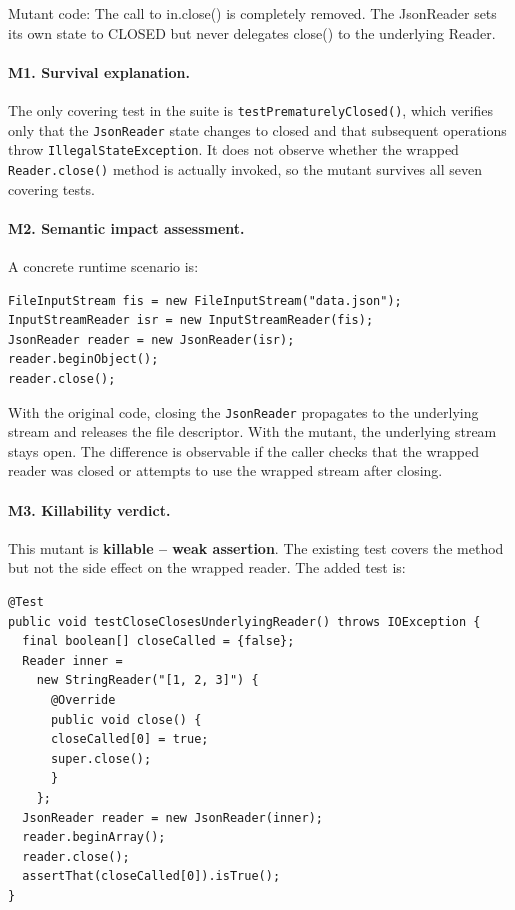 \documentclass[11pt]{article}
\begin{document}
Mutant code: The call to in.close() is completely removed. The JsonReader sets its own state to CLOSED but never delegates close() to the underlying Reader.

\paragraph{M1. Survival explanation.}
The only covering test in the suite is \texttt{testPrematurelyClosed()}, which verifies only that the \texttt{JsonReader} state changes to closed and that subsequent operations throw \texttt{IllegalStateException}. It does not observe whether the wrapped \texttt{Reader.close()} method is actually invoked, so the mutant survives all seven covering tests.

\paragraph{M2. Semantic impact assessment.}
A concrete runtime scenario is:
\begin{lstlisting}[basicstyle=\ttfamily\small,breaklines=true]
FileInputStream fis = new FileInputStream("data.json");
InputStreamReader isr = new InputStreamReader(fis);
JsonReader reader = new JsonReader(isr);
reader.beginObject();
reader.close();
\end{lstlisting}

With the original code, closing the \texttt{JsonReader} propagates to the underlying stream and releases the file descriptor. With the mutant, the underlying stream stays open. The difference is observable if the caller checks that the wrapped reader was closed or attempts to use the wrapped stream after closing.

\paragraph{M3. Killability verdict.}
This mutant is \textbf{killable -- weak assertion}. The existing test covers the method but not the side effect on the wrapped reader. The added test is:
\begin{lstlisting}[basicstyle=\ttfamily\small,breaklines=true]
@Test
public void testCloseClosesUnderlyingReader() throws IOException {
  final boolean[] closeCalled = {false};
  Reader inner =
    new StringReader("[1, 2, 3]") {
      @Override
      public void close() {
      closeCalled[0] = true;
      super.close();
      }
    };
  JsonReader reader = new JsonReader(inner);
  reader.beginArray();
  reader.close();
  assertThat(closeCalled[0]).isTrue();
}
\end{lstlisting}
\end{document}
